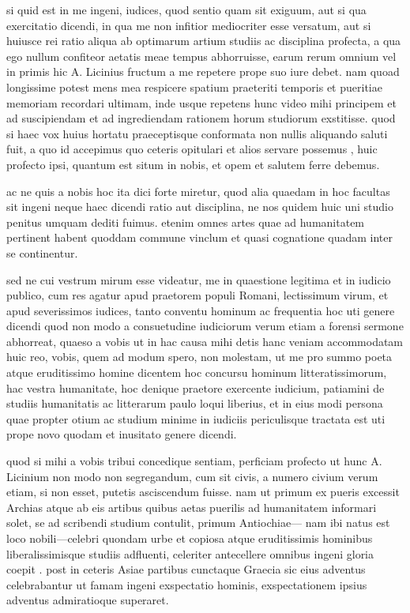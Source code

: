 
 si quid est in me ingeni, iudices, quod sentio quam sit exiguum, aut si qua exercitatio dicendi, in qua me non infitior mediocriter esse versatum, aut si huiusce rei ratio aliqua ab optimarum artium studiis ac disciplina profecta, a qua ego nullum confiteor aetatis meae tempus abhorruisse, earum rerum omnium vel in primis hic A. Licinius fructum a me repetere prope suo iure debet. nam quoad longissime potest mens mea respicere spatium praeteriti temporis et pueritiae memoriam recordari ultimam, inde usque repetens hunc video mihi principem et ad suscipiendam et ad ingrediendam rationem horum studiorum exstitisse. quod si haec vox huius hortatu praeceptisque conformata non nullis aliquando saluti fuit, a quo id accepimus quo ceteris opitulari et alios servare possemus , huic profecto ipsi, quantum est situm in nobis, et opem et salutem ferre debemus.

 ac ne quis a nobis hoc ita dici forte miretur, quod alia quaedam in hoc facultas sit ingeni neque haec dicendi ratio aut disciplina, ne nos quidem huic uni studio penitus umquam dediti fuimus. etenim omnes artes quae ad humanitatem pertinent habent quoddam commune vinclum et quasi cognatione quadam inter se continentur.

 sed ne cui vestrum mirum esse videatur, me in quaestione legitima et in iudicio publico, cum res agatur apud praetorem populi Romani, lectissimum virum, et apud severissimos iudices, tanto conventu hominum ac frequentia hoc uti genere dicendi quod non modo a consuetudine iudiciorum verum etiam a forensi sermone abhorreat, quaeso a vobis ut in hac causa mihi detis hanc veniam accommodatam huic reo, vobis, quem ad modum spero, non molestam, ut me pro summo poeta atque eruditissimo homine dicentem hoc concursu hominum litteratissimorum, hac vestra humanitate, hoc denique praetore exercente iudicium, patiamini de studiis humanitatis ac litterarum paulo loqui liberius, et in eius modi persona quae propter otium ac studium minime in iudiciis periculisque tractata est uti prope novo quodam et inusitato genere dicendi.

 quod si mihi a vobis tribui concedique sentiam, perficiam profecto ut hunc A. Licinium non modo non segregandum, cum sit civis, a numero civium verum etiam, si non esset, putetis asciscendum fuisse. nam ut primum ex pueris excessit Archias atque ab eis artibus quibus aetas puerilis ad humanitatem informari solet, se ad scribendi studium contulit, primum Antiochiae— nam ibi natus est loco nobili—celebri quondam urbe et copiosa atque eruditissimis hominibus liberalissimisque studiis adfluenti, celeriter antecellere omnibus ingeni gloria coepit . post in ceteris Asiae partibus cunctaque Graecia sic eius adventus celebrabantur ut famam ingeni exspectatio hominis, exspectationem ipsius adventus admiratioque superaret.

